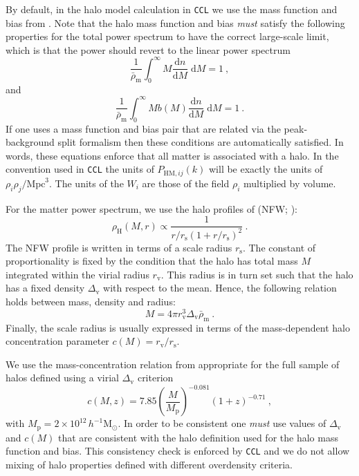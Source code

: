 \documentclass[\docopts]{\docclass}
\newcommand{\ccl}{{\tt CCL}\xspace}
\begin{document}
By default, in the halo model calculation in \ccl we use the mass function and bias from \cite{Sheth1999}. Note that the halo mass function and bias \emph{must} satisfy the following properties for the total power spectrum to have the correct large-scale limit, which is that the power should revert to the linear power spectrum
\begin{equation}
\frac{1}{\bar\rho_\mathrm{m}}\int_0^\infty M\frac{\mathrm{d}n}{\mathrm{d}M}\;\mathrm{d}M=1\ ,
\label{eq:mf_normalisation}
\end{equation}
and
\begin{equation}
\frac{1}{\bar\rho_\mathrm{m}}\int_0^\infty Mb(M)\frac{\mathrm{d}n}{\mathrm{d}M}\;\mathrm{d}M=1\ .
\label{eq:bias_normalisation}
\end{equation}
If one uses a mass function and bias pair that are related via the peak-background split formalism \citep{Mo1996,Sheth2001} then these conditions are automatically satisfied. In words, these equations enforce that all matter is associated with a halo. In the convention used in \ccl the units of $P_{\mathrm{HM},ij}(k)$ will be exactly the units of $\rho_i\rho_j / \mathrm{Mpc}^3$. The units of the $W_i$ are those of the field $\rho_i$ multiplied by volume. 

For the matter power spectrum, we use the halo profiles of \citeauthor*{Navarro1997} (NFW; \citeyear{Navarro1997}):
\begin{equation}
\rho_\mathrm{H}(M,r)\propto\frac{1}{r/r_\mathrm{s}(1+r/r_\mathrm{s})^2}\ .
\label{eq:NFW_profile}
\end{equation}
The NFW profile is written in terms of a scale radius $r_\mathrm{s}$. The constant of proportionality is fixed by the condition that the halo has total mass $M$ integrated within the virial radius $r_\mathrm{v}$. This radius is in turn set such that the halo has a fixed density $\Delta_\mathrm{v}$ with respect to the mean. Hence, the following relation holds between mass, density and radius:
\begin{equation}
M=4\pi r_\mathrm{v}^3\Delta_\mathrm{v}\bar\rho_\mathrm{m}\ .
\label{eq:virial_radius}
\end{equation}
Finally, the scale radius is usually expressed in terms of the mass-dependent halo concentration parameter $c(M)=r_\mathrm{v}/r_\mathrm{s}$.

We use the mass-concentration relation from \cite{Duffy2008} appropriate for the full sample of halos defined using a virial $\Delta_\mathrm{v}$ criterion
\begin{equation}
  c(M,z)=7.85\left(\frac{M}{M_\mathrm{p}}\right)^{-0.081}(1+z)^{-0.71}\ ,
  \label{eq:cDuffy}
\end{equation}
with $M_\mathrm{p}=2\times10^{12}\,h^{-1}\mathrm{M}_\odot$.
In order to be consistent one \emph{must} use values of $\Delta_\mathrm{v}$ and $c(M)$ that are consistent with the halo definition used for the halo mass function and bias. This consistency check is enforced by \ccl and we do not allow mixing of halo properties defined with different overdensity criteria.
\end{document}
